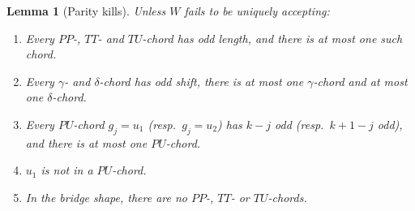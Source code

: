 \documentclass[11pt]{article}
\newtheorem{lemma}[theorem]{Lemma}
\theoremstyle{definition}
\begin{document}
\begin{lemma}[Parity kills]\label{lem:parity2}
Unless $W$ fails to be uniquely accepting:
\begin{enumerate}[leftmargin=2.2em,itemsep=2pt,label=(\alph*)]
\item Every $PP$-, $TT$- and $TU$-chord has odd length, and there is at most
one such chord.
\item Every $\gamma$- and $\delta$-chord has odd shift, there is at most one
$\gamma$-chord and at most one $\delta$-chord.
\item Every $PU$-chord $g_j=u_1$ (resp.\ $g_j=u_2$) has $k-j$ odd (resp.\
$k+1-j$ odd), and there is at most one $PU$-chord.
\item $u_1$ is not in a $PU$-chord.
\item In the bridge shape, there are no $PP$-, $TT$- or $TU$-chords.
\end{enumerate}
\end{lemma}
\end{document}
